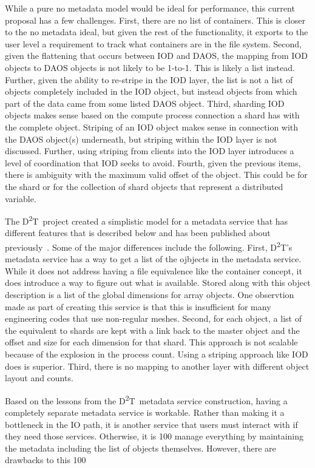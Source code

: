 \documentclass[conference]{sig-alt-gov2}
\newcommand{\DDT}{D\textsuperscript{2}T~}
\newcommand{\DDTns}{D\textsuperscript{2}T}
\begin{document}
While a pure no metadata model would be ideal for performance, this current
proposal has a few challenges. First, there are no list of containers. This
is closer to the no metadata ideal, but given the rest of the functionality,
it exports to the user level a requirement to track what containers are in the
file system. Second, given the flattening that occurs between IOD and DAOS,
the mapping from IOD objects to DAOS objects is not likely to be 1-to-1. This
is likely a list instead. Further, given the ability to re-stripe in the IOD
layer, the list is not a list of objects completely included in the IOD object,
but instead objects from which part of the data came from some listed DAOS
object.  Third, sharding IOD objects makes sense based on the compute process
connection a shard has with the complete object. Striping of an IOD object
makes sense in connection with the DAOS object(s) underneath, but striping
within the IOD layer is not discussed. Further, using striping from clients
into the IOD layer introduces a level of coordination that IOD seeks to avoid.
Fourth, given the previous items, there is ambiguity with the maximum valid
offset of the object. This could be for the shard or for the collection of
shard objects that represent a distributed variable.

The \DDT project created a simplistic model for a metadata service that has
different features that is described below and has been published about
previously~\cite{lofstead:2011:txn-metadata}. Some of the major differences
include the following. First, \DDTns's metadata service has a way to get a list
of the ojbjects in the metadata service. While it does not address having a
file equivalence like the container concept, it does introduce a way to figure
out what is available. Stored along with this object description is a list of
the global dimensions for array objects. One observtion made as part of
creating this service is that this is insufficient for many engineering codes
that use non-regular meshes. Second, for each object, a list of the equivalent
to shards are kept with a link back to the master object and the offset and
size for each dimension for that shard. This approach is not scalable because
of the explosion in the process count. Using a striping approach like IOD does
is superior. Third, there is no mapping to another layer with different object
layout and counts.

Based on the lessons from the \DDT metadata service construction, having a
completely separate metadata service is workable. Rather than making it a
bottleneck in the IO path, it is another service that users must interact with
if they need those services. Otherwise, it is 100%
manage everything by maintaining the metadata including the list of objects
themselves. However, there are drawbacks to this 100%
\end{document}
